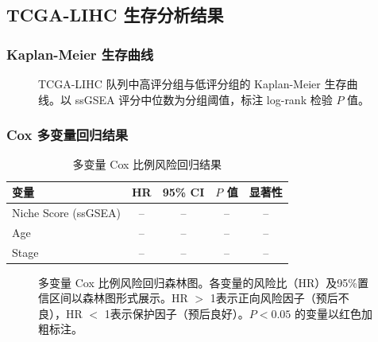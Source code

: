 \documentclass[12pt, a4paper]{ctexart}
\begin{document}
\subsection{TCGA-LIHC 生存分析结果}

\subsubsection{Kaplan-Meier 生存曲线}

\begin{figure}[H]
\centering
\caption{TCGA-LIHC 队列中高评分组与低评分组的 Kaplan-Meier 生存曲线。以 ssGSEA 评分中位数为分组阈值，标注 log-rank 检验 $P$ 值。}
\label{fig:km_plot}
\end{figure}

\subsubsection{Cox 多变量回归结果}

\begin{table}[H]
\centering
\caption{多变量 Cox 比例风险回归结果}
\label{tab:cox_results}
\begin{tabular}{lcccc}
\toprule
\textbf{变量} & \textbf{HR} & \textbf{95\% CI} & \textbf{$P$ 值} & \textbf{显著性} \\
\midrule
Niche Score (ssGSEA) & -- & -- & -- & -- \\
Age & -- & -- & -- & -- \\
Stage & -- & -- & -- & -- \\
\bottomrule
\end{tabular}
\end{table}

\begin{figure}[H]
\centering
\caption{多变量 Cox 比例风险回归森林图。各变量的风险比（HR）及95\%置信区间以森林图形式展示。HR $>$ 1表示正向风险因子（预后不良），HR $<$ 1表示保护因子（预后良好）。$P < 0.05$ 的变量以红色加粗标注。}
\label{fig:cox_forest}
\end{figure}
\end{document}
